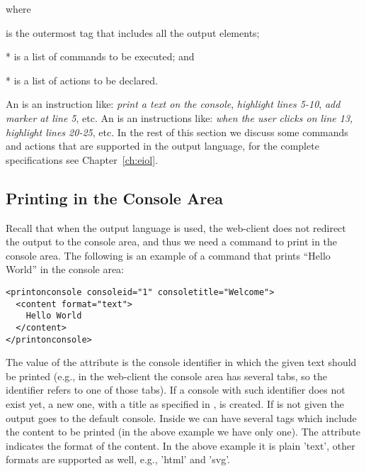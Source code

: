 \medskip
\noindent
where
\begin{inparaenum}
\item {} is the outermost tag that includes all the output
  elements;
\item {}* is a list of commands to be
  executed; and
\item {}* is a list of actions to be
  declared.
\end{inparaenum}
%
An  is an instruction like: \emph{print a text
  on the console}, \emph{highlight lines 5-10}, \emph{add marker at
  line 5}, etc.
%
An  is an instructions like: \emph{when the
  user clicks on line 13, highlight lines 20-25}, etc.
%
In the rest of this section we discuss some commands and actions that
are supported in the \ei output language, for the complete
specifications see Chapter~\ref{ch:eiol}.

\subsection{Printing in the Console Area}

Recall that when the \ei output language is used, the web-client does
not redirect the output to the console area, and thus we need a command
to print in the console area.
%
The following is an example of a command that prints ``Hello World''
in the console area:

\medskip
\begin{lstlisting}
<printonconsole consoleid="1" consoletitle="Welcome">
  <content format="text">
    Hello World
  </content>
</printonconsole>
\end{lstlisting}

\medskip
\noindent
The value of the  attribute is the console identifier
in which the given text should be printed (e.g., in the web-client the
console area has several tabs, so the identifier refers to one of
those tabs). If a console with such identifier does not exist yet, a
new one, with a title as specified in , is
created. If  is not given the output goes to the
default console.
%
Inside  we can have several  tags
which include the content to be printed (in the above example we have
only one). The attribute  indicates the format of the
content. In the above example it is plain 'text', other formats are
supported as well, e.g., 'html' and 'svg'.
%


